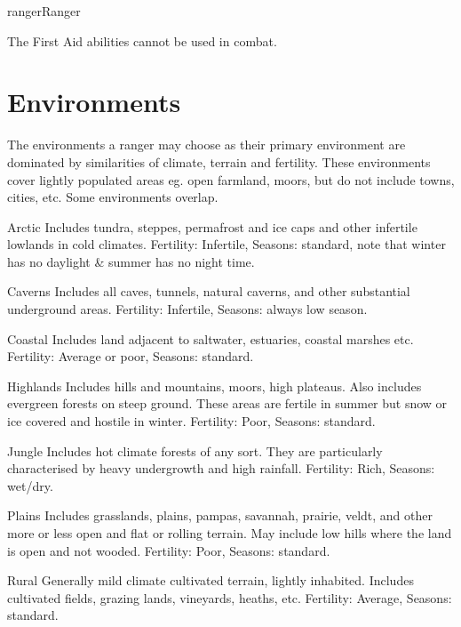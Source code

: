 \begin{Skill}[2.1]{ranger}{Ranger}
\begin{Description}
The First Aid abilities cannot be used in combat.

\end{Description}

\section{Environments}

The environments a ranger may choose as their primary environment are
dominated by similarities of climate, terrain and fertility. These
environments cover lightly populated areas eg.  open farmland, moors,
but do not include towns, cities, etc.  Some environments overlap.

\begin{Description}

\item[Arctic] Includes tundra, steppes, permafrost and ice caps and
  other infertile lowlands in cold climates.  Fertility: Infertile,
  Seasons: standard, note that winter has no daylight \& summer has no
  night time.

\item[Caverns] Includes all caves, tunnels, natural caverns, and other
  substantial underground areas.  Fertility: Infertile, Seasons:
  always low season.

\item[Coastal] Includes land adjacent to saltwater, estuaries, coastal
  marshes etc. Fertility: Average or poor, Seasons: standard.

\item[Highlands] Includes hills and mountains, moors, high plateaus.
  Also includes evergreen forests on steep ground. These areas are
  fertile in summer but snow or ice covered and hostile in
  winter. Fertility: Poor, Seasons: standard.

\item[Jungle] Includes hot climate forests of any sort.  They are
  particularly characterised by heavy undergrowth and high rainfall.
  Fertility: Rich, Seasons: wet/dry.

\item[Plains] Includes grasslands, plains, pampas, savannah, prairie,
  veldt, and other more or less open and flat or rolling terrain. May
  include low hills where the land is open and not wooded.  Fertility:
  Poor, Seasons: standard.

\item[Rural] Generally mild climate cultivated terrain, lightly
  inhabited. Includes cultivated fields, grazing lands, vineyards,
  heaths, etc.  Fertility: Average, Seasons: standard.


\end{Description}
\end{Skill}
